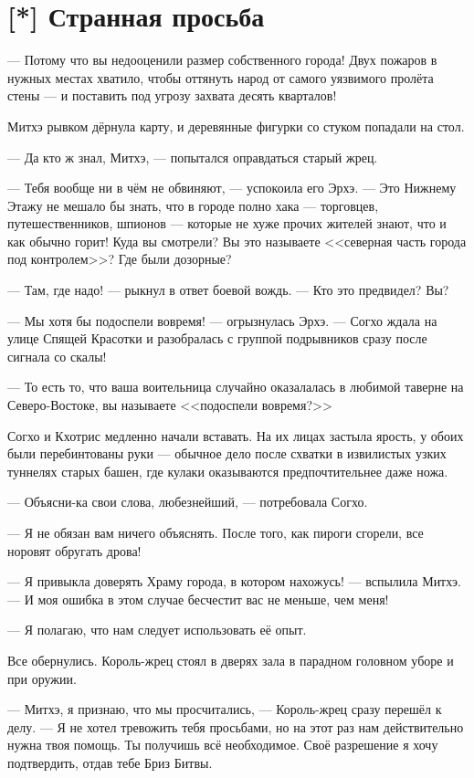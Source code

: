 \section{[*] Странная просьба}

--- Потому что вы недооценили размер собственного города!
Двух пожаров в нужных местах хватило, чтобы оттянуть народ от самого уязвимого пролёта стены --- и поставить под угрозу захвата десять кварталов!

Митхэ рывком дёрнула карту, и деревянные фигурки со стуком попадали на стол.

--- Да кто ж знал, Митхэ, --- попытался оправдаться старый жрец.

--- Тебя вообще ни в чём не обвиняют, --- успокоила его Эрхэ.
--- Это Нижнему Этажу не мешало бы знать, что в городе полно хака --- торговцев, путешественников, шпионов --- которые не хуже прочих жителей знают, что и как обычно горит!
Куда вы смотрели?
Вы это называете <<северная часть города под контролем>>?
Где были дозорные?

--- Там, где надо! --- рыкнул в ответ боевой вождь.
--- Кто это предвидел?
Вы?

--- Мы хотя бы подоспели вовремя! --- огрызнулась Эрхэ.
--- Согхо ждала на улице Спящей Красотки и разобралась с группой подрывников сразу после сигнала со скалы!

--- То есть то, что ваша воительница случайно оказалалась в любимой таверне на Северо-Востоке, вы называете <<подоспели вовремя?>>

Согхо и Кхотрис медленно начали вставать.
На их лицах застыла ярость, у обоих были перебинтованы руки --- обычное дело после схватки в извилистых узких туннелях старых башен, где кулаки оказываются предпочтительнее даже ножа.

--- Объясни-ка свои слова, любезнейший, --- потребовала Согхо.

--- Я не обязан вам ничего объяснять.
После того, как пироги сгорели, все норовят обругать дрова!

--- Я привыкла доверять Храму города, в котором нахожусь! --- вспылила Митхэ.
--- И моя ошибка в этом случае бесчестит вас не меньше, чем меня!

--- Я полагаю, что нам следует использовать её опыт.

Все обернулись.
Король-жрец стоял в дверях зала в парадном головном уборе и при оружии.

--- Митхэ, я признаю, что мы просчитались, --- Король-жрец сразу перешёл к делу.
--- Я не хотел тревожить тебя просьбами, но на этот раз нам действительно нужна твоя помощь.
Ты получишь всё необходимое.
Своё разрешение я хочу подтвердить, отдав тебе Бриз Битвы.

